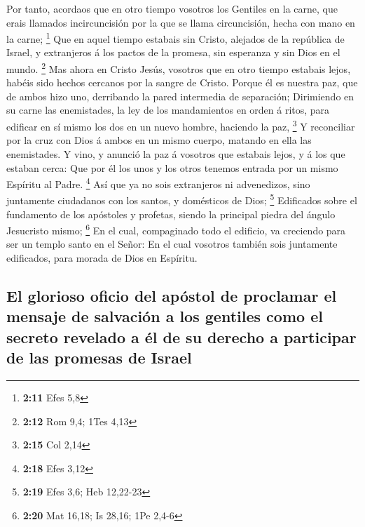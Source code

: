  Por tanto, acordaos que en otro tiempo vosotros los
Gentiles en la carne, que erais llamados incircuncisión por la que se
llama circuncisión, hecha con mano en la carne; \footnote{\textbf{2:11}
  Efes 5,8}  Que en aquel tiempo estabais sin Cristo,
alejados de la república de Israel, y extranjeros á los pactos de la
promesa, sin esperanza y sin Dios en el mundo. \footnote{\textbf{2:12}
  Rom 9,4; 1Tes 4,13}  Mas ahora en Cristo Jesús,
vosotros que en otro tiempo estabais lejos, habéis sido hechos cercanos
por la sangre de Cristo.  Porque él es nuestra paz, que
de ambos hizo uno, derribando la pared intermedia de separación;
 Dirimiendo en su carne las enemistades, la ley de los
mandamientos en orden á ritos, para edificar en sí mismo los dos en un
nuevo hombre, haciendo la paz, \footnote{\textbf{2:15} Col 2,14}
 Y reconciliar por la cruz con Dios á ambos en un mismo
cuerpo, matando en ella las enemistades.  Y vino, y
anunció la paz á vosotros que estabais lejos, y á los que estaban cerca:
 Que por él los unos y los otros tenemos entrada por un
mismo Espíritu al Padre. \footnote{\textbf{2:18} Efes 3,12}
 Así que ya no sois extranjeros ni advenedizos, sino
juntamente ciudadanos con los santos, y domésticos de Dios; \footnote{\textbf{2:19}
  Efes 3,6; Heb 12,22-23}  Edificados sobre el fundamento
de los apóstoles y profetas, siendo la principal piedra del ángulo
Jesucristo mismo; \footnote{\textbf{2:20} Mat 16,18; Is 28,16; 1Pe 2,4-6}
 En el cual, compaginado todo el edificio, va creciendo
para ser un templo santo en el Señor:  En el cual
vosotros también sois juntamente edificados, para morada de Dios en
Espíritu.

\hypertarget{el-glorioso-oficio-del-apuxf3stol-de-proclamar-el-mensaje-de-salvaciuxf3n-a-los-gentiles-como-el-secreto-revelado-a-uxe9l-de-su-derecho-a-participar-de-las-promesas-de-israel}{%
\subsection{El glorioso oficio del apóstol de proclamar el mensaje de
salvación a los gentiles como el secreto revelado a él de su derecho a
participar de las promesas de
Israel}\label{el-glorioso-oficio-del-apuxf3stol-de-proclamar-el-mensaje-de-salvaciuxf3n-a-los-gentiles-como-el-secreto-revelado-a-uxe9l-de-su-derecho-a-participar-de-las-promesas-de-israel}}

